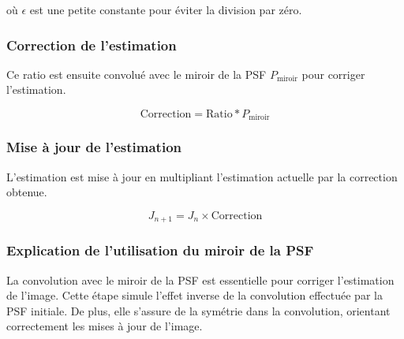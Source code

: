 où \( \epsilon \) est une petite constante pour éviter la division par zéro.

\subsubsection{Correction de l'estimation}
Ce ratio est ensuite convolué avec le miroir de la PSF \( P_{\text{miroir}} \) pour corriger l'estimation.

\begin{equation}
\text{Correction} = \text{Ratio} \ast P_{\text{miroir}}
\end{equation}

\subsubsection{Mise à jour de l'estimation}
L'estimation est mise à jour en multipliant l'estimation actuelle par la correction obtenue.

\begin{equation}
J_{n+1} = J_n \times \text{Correction}
\end{equation}

\subsubsection{Explication de l'utilisation du miroir de la PSF}

La convolution avec le miroir de la PSF est essentielle pour corriger l'estimation de l'image. 
Cette étape simule l'effet inverse de la convolution effectuée par la PSF initiale.
De plus, elle s'assure de la symétrie dans la convolution, orientant correctement les mises à jour de l'image.